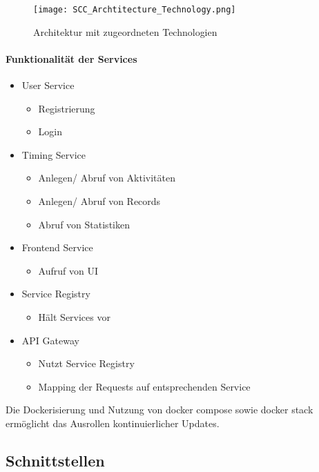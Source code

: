 \begin{figure}[H]
	\hspace{-1.5cm}
	\texttt{[image: SCC\_Archtitecture\_Technology.png]}
	\caption{Architektur mit zugeordneten Technologien}
	\label{fig:ArchitekturTech}
\end{figure}





\paragraph{Funktionalität der Services}
\begin{itemize}
	\item User Service
	\begin{itemize}
		\item Registrierung
		\item Login
	\end{itemize}
	\item Timing Service
	\begin{itemize}
		\item Anlegen/ Abruf von Aktivitäten
		\item Anlegen/ Abruf von Records
		\item Abruf von Statistiken
	\end{itemize}
	\item Frontend Service
	\begin{itemize}
		\item Aufruf von UI
	\end{itemize}
	\item Service Registry
	\begin{itemize}
		\item Hält Services vor
	\end{itemize}
	\item API Gateway
	\begin{itemize}
		\item Nutzt Service Registry
		\item Mapping der Requests auf entsprechenden Service
	\end{itemize}
\end{itemize}

Die Dockerisierung und Nutzung von docker compose sowie docker stack ermöglicht das Ausrollen kontinuierlicher Updates.

\subsection{Schnittstellen}

